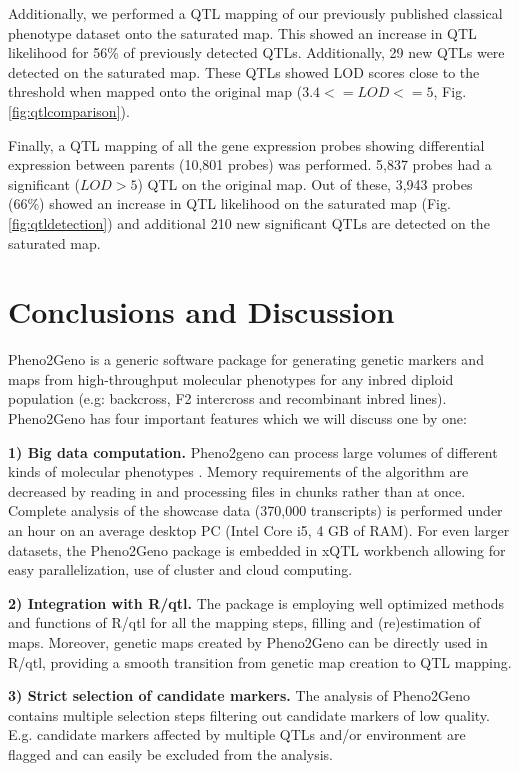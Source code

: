 Additionally, we performed a QTL mapping of our previously published classical 
phenotype dataset\cite{Joosen:2011} onto the saturated map. This showed an increase in QTL 
likelihood for 56\% of previously detected QTLs. Additionally, 29 new QTLs were detected 
on the saturated map. These QTLs showed LOD scores close to the threshold when mapped 
onto the original map ($ 3.4 <= LOD <= 5$, Fig. \ref{fig:qtlcomparison}).

Finally,  a QTL mapping of all the gene expression probes showing differential expression 
between parents (10,801 probes) was performed. 5,837 probes had a significant ($LOD > 5$) 
QTL on the original map. Out of these, 3,943 probes (66\%) showed an increase in QTL 
likelihood on the saturated map (Fig. \ref{fig:qtldetection}) and additional 210 new significant QTLs are 
detected on the saturated map.
  
\section{Conclusions and Discussion}
Pheno2Geno is a generic software package for generating genetic markers and maps from 
high-throughput molecular phenotypes for any inbred diploid population (e.g: backcross, 
F2 intercross and recombinant inbred lines). Pheno2Geno has four important features which 
we will discuss one by one:

{\bf 1) Big data computation.}
Pheno2geno can process large volumes of different kinds of molecular phenotypes \cite{Trelles:2011}. 
Memory requirements of the algorithm are decreased by reading in and processing 
files in chunks rather than at once. Complete analysis of the showcase data (370,000 transcripts) 
is performed under an hour on an average desktop PC (Intel Core i5, 4 GB of RAM). For even larger 
datasets, the Pheno2Geno package is embedded in xQTL workbench \cite{Arends:2012, Snoek:2012} 
allowing for easy parallelization, use of cluster and cloud computing.

{\bf 2) Integration with R/qtl.}
The package is employing well optimized methods and functions of R/qtl for all the mapping steps,
filling and (re)estimation of maps. Moreover, genetic maps created by Pheno2Geno can be directly 
used in R/qtl, providing a smooth transition from genetic map creation to QTL mapping.

{\bf 3) Strict selection of candidate markers.}
The analysis of Pheno2Geno contains multiple selection steps filtering out candidate markers of 
low quality. E.g. candidate markers affected by multiple QTLs and/or environment are flagged and 
can easily be excluded from the analysis.

